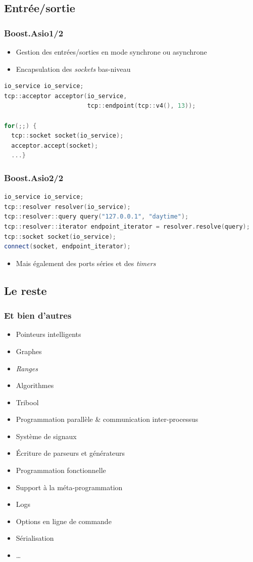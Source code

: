\documentclass[C++.tex]{subfiles}
\begin{document}
\subsection*{Entrée/sortie}
\begin{frame}[fragile]
	\frametitle{Boost.Asio\titlehfill{}1/2}
	\begin{itemize}
		\item Gestion des entrées/sorties en mode synchrone ou asynchrone
		\item Encapsulation des \textit{sockets} bas-niveau
	\end{itemize}

	\begin{lstlisting}[language=C++]
io_service io_service;
tcp::acceptor acceptor(io_service, 
                       tcp::endpoint(tcp::v4(), 13));

for(;;) {
  tcp::socket socket(io_service);
  acceptor.accept(socket);
  ...}\end{lstlisting}
\end{frame}

\begin{frame}[fragile]
	\frametitle{Boost.Asio\titlehfill{}2/2}
	\begin{lstlisting}[language=C++]
io_service io_service;
tcp::resolver resolver(io_service);
tcp::resolver::query query("127.0.0.1", "daytime");
tcp::resolver::iterator endpoint_iterator = resolver.resolve(query);
tcp::socket socket(io_service);
connect(socket, endpoint_iterator);\end{lstlisting}

	\begin{itemize}
		\item Mais également des ports séries et des \textit{timers}
	\end{itemize}
\end{frame}

\subsection*{Le reste}
\begin{frame}[fragile]
	\frametitle{Et bien d'autres}
	\begin{itemize}
		\item Pointeurs intelligents
		\item Graphes
		\item \textit{Ranges}
		\item Algorithmes
		\item Tribool
		\item Programmation parallèle \& communication inter-processus
		\item Système de signaux
		\item Écriture de parseurs et générateurs
		\item Programmation fonctionnelle
		\item Support à la méta-programmation
		\item Logs
		\item Options en ligne de commande
		\item Sérialisation
		\item \ldots
	\end{itemize}
\end{frame}
\end{document}
